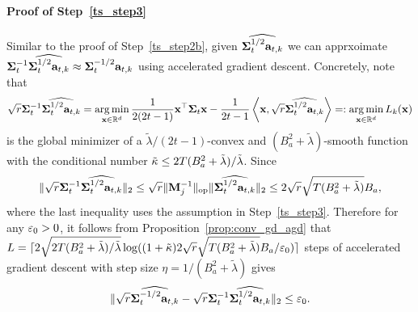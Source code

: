 \paragraph{Proof of Step~\ref{ts_step3}}
Similar to the proof of Step~\ref{ts_step2b}, given $\widehat{{{\mathbf\Sigma}}_t^{1/2}{\mathbf a}_{t,k}}$ we can apprxoimate ${{\mathbf\Sigma}}_t^{-1}\widehat{{{\mathbf\Sigma}}_t^{1/2}{\mathbf a}_{t,k}}\approx {{\mathbf\Sigma}}_t^{-1/2}{\mathbf a}_{t,k}$ using accelerated gradient descent. Concretely, note that 
\begin{align*}
   \sqrt{{r}}{{\mathbf\Sigma}}_t^{-1}\widehat{{{\mathbf\Sigma}}_t^{1/2}{\mathbf a}_{t,k}} =\operatorname*{arg\,min}_{{\mathbf x}\in\mathbb{R}^d}\frac{1}{2(2t-1)}{\mathbf x}^\top{{\mathbf\Sigma}}_t{\mathbf x}-\frac{1}{2t-1}\left\langle{\mathbf x},  \sqrt{{r}}\widehat{{{\mathbf\Sigma}}_t^{1/2}{\mathbf a}_{t,k}}\right\rangle=:\operatorname*{arg\,min}_{{\mathbf x}\in\mathbb{R}^d} L_{k}({\mathbf x})
\end{align*}
is the global minimizer of a $\tilde\lambda/(2t-1)$-convex and $(B_a^2+\tilde\lambda)$-smooth function with the conditional number ${\tilde \kappa}\leq 2T(B_a^2+\tilde\lambda)/\tilde\lambda$. Since 
$$
\|\sqrt{{r}}{{\mathbf\Sigma}}_t^{-1}\widehat{{{\mathbf\Sigma}}_t^{1/2}{\mathbf a}_{t,k}} \|_2\leq\sqrt{{r}}\|{{\mathbf {M}}_j^{-1}}\|_{\mathrm{op}}\|\widehat{{{\mathbf\Sigma}}_t^{1/2}{\mathbf a}_{t,k}} \|_2\leq 2\sqrt{{r}}\sqrt{T(B_a^2+\tilde\lambda)}B_a,$$
where the last inequality uses the assumption in Step~\ref{ts_step3}.
Therefore for any $\varepsilon_0>0$, it follows from Proposition~\ref{prop:conv_gd_agd} that
$L=\lceil2\sqrt{2 T(B_a^2+\tilde\lambda)/\tilde\lambda}\log((1+{\tilde \kappa})2\sqrt{{r}}\sqrt{T(B_a^2+\tilde\lambda)}B_a/\varepsilon_0)\rceil$ steps of accelerated gradient descent with step size $\eta=1/(B_a^2+\tilde\lambda)$ gives  $$\|\sqrt{{r}}\widehat{{{\mathbf\Sigma}}_t^{-1/2}{\mathbf a}_{t,k}} -\sqrt{{r}}{{\mathbf\Sigma}}_t^{-1}\widehat{{{\mathbf\Sigma}}_t^{1/2}{\mathbf a}_{t,k}} \|_2\leq\varepsilon_0.$$ 


